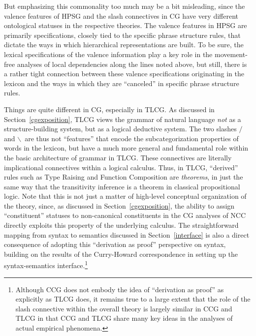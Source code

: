 \documentclass[output=paper,biblatex,babelshorthands,newtxmath,draftmode,colorlinks,citecolor=brown]{langscibook}
\begin{document}
\largerpage
But emphasizing this commonality too much may be a bit misleading,
since the valence features of HPSG and the slash connectives in CG
have very different ontological statuses in the respective theories.
The valence features in HPSG are primarily specifications, closely
tied to the specific phrase structure rules, that dictate the ways in
which hierarchical representations are built. To be sure, the lexical
specifications of the valence information play a key role in the
movement-free analyses of local dependencies
along the lines noted
above, but still, there is a rather tight connection between these
valence specifications originating in the lexicon and the ways in
which they are ``canceled'' in specific phrase structure rules.

Things are quite different in CG, especially in TLCG. As discussed in
Section~\ref{cgexposition}, TLCG views the grammar of natural language \emph{not} as a
structure-building system, but as a logical deductive system. The two
slashes \ensuremath{/} and \ensuremath{\backslash}\ are thus not ``features'' that encode the
subcategorization properties of words in the lexicon, but have a much
more general and fundamental role within the basic architecture of
grammar in TLCG. These connectives are literally 
implicational connectives within a logical calculus. Thus, in TLCG,
``derived'' rules such as
Type Raising and Function Composition are \emph{theorems}, in just the same
way that the 
transitivity inference is a theorem in classical propositional logic.
Note that this is not just a matter of high-level conceptual
organization of the theory, since, as discussed in Section~\ref{cgexposition}, the
ability to assign ``constituent'' statuses to non-canonical constituents
in the CG analyses of NCC directly exploits this property of the
underlying calculus. The straightforward mapping from syntax to
semantics discussed in Section~\ref{interface} is also a direct
consequence of adopting this ``derivation as proof'' perspective on
syntax, building on the results of the Curry-Howard correspondence
\citep{howard80} in
setting up the syntax-semantics interface.\footnote{Although CCG does
not embody the idea of ``derivation as proof'' as explicitly as TLCG
does, it remains true to a large extent that the role of the slash
connective within the overall theory is largely similar in CCG and TLCG
in that CCG and TLCG share many key 
ideas in the analyses of actual empirical phenomena.}
\end{document}
